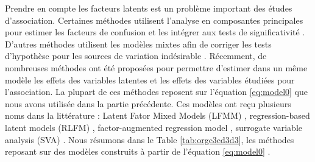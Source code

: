 \documentclass[12pt,a4paper,twoside]{ugathesis}
\begin{document}
Prendre en compte les facteurs latents est un problème important des études
d'association. Certaines méthodes utilisent l'analyse en composantes principales
pour estimer les facteurs de confusion et les intégrer aux tests de
significativité \citep{Rahmani_2016,Price_2006}. D'autres méthodes utilisent les
modèles mixtes afin de corriger les tests d'hypothèse pour les sources de
variation indésirable \citep{Kang_2008,Zhou_2014,Loh194944}. Récemment, de
nombreuses méthodes ont été proposées pour permettre d'estimer dans un même
modèle les effets des variables latentes et les effets des variables étudiées
pour l'association. La plupart de ces méthodes reposent sur l'équation
\eqref{eq:model0} que nous avons utilisée dans la partie précédente. Ces modèles
ont reçu plusieurs noms dans la littérature : Latent Fator Mixed Models (LFMM)
\citep{Frichot_2013}, regression-based latent models (RLFM)
\citep{agarwal09_regres}, factor-augmented regression model
\citep{gerard2017empirical}, surrogate variable analysis (SVA)
\citep{article_Leek_Storey_2007}. Nous résumons dans le Table
\ref{tab:orgc3cd3d3}, les méthodes reposant sur des modèles construits à
partir de l'équation \eqref{eq:model0} .
\end{document}
